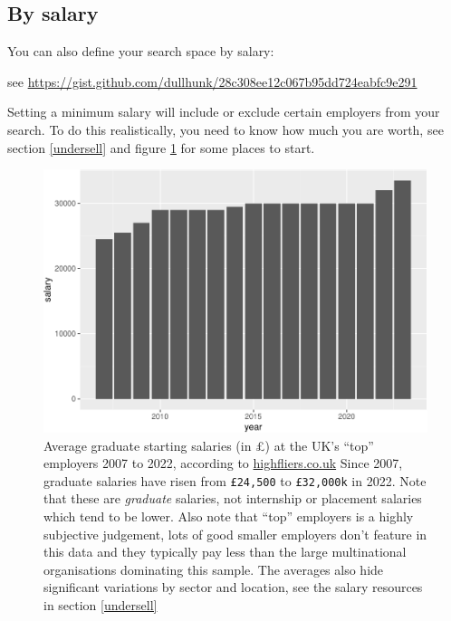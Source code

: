 \documentclass[
]{book}
\begin{document}
\hypertarget{by-salary}{%
\subsection{By salary}\label{by-salary}}

You can also define your search space by salary:

see \url{https://gist.github.com/dullhunk/28c308ee12c067b95dd724eabfc9e291}

Setting a minimum salary will include or exclude certain employers from your search. To do this realistically, you need to know how much you are worth, see section \ref{undersell} and figure \ref{fig:salaries-fig} for some places to start.

\begin{figure}

{\centering \includegraphics[width=1\linewidth]{cdyf_files/figure-latex/salaries-fig-1} 

}

\caption{Average graduate starting salaries (in £) at the UK's ``top'' employers 2007 to 2022, according to \href{https://www.highfliers.co.uk}{highfliers.co.uk} \citep{highfliers2022} Since 2007, graduate salaries have risen from \texttt{£24,500} to \texttt{£32,000k} in 2022. Note that these are \emph{graduate} salaries, not internship or placement salaries which tend to be lower. Also note that ``top'' employers is a highly subjective judgement, lots of good smaller employers don't feature in this data and they typically pay less than the large multinational organisations dominating this sample. The averages also hide significant variations by sector and location, see the salary resources in section \ref{undersell}}\label{fig:salaries-fig}
\end{figure}
\end{document}
